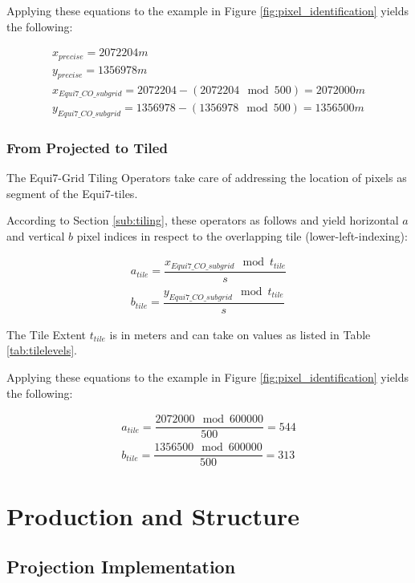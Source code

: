 \documentclass[10pt,a4paper]{article}
\begin{document}
Applying these equations to the example in Figure \ref{fig:pixel_identification} yields the following:

\begin{eqnarray*}
x_{precise} = 2072204m \\
y_{precise} = 1356978m \\
x_{Equi7\_CO\_subgrid} = 2072204 - (2072204\mod 500) = 2072000m \\
y_{Equi7\_CO\_subgrid} = 1356978 - (1356978\mod 500) = 1356500m
\end{eqnarray*}

\subsubsection*{From Projected to Tiled}
The Equi7-Grid Tiling Operators take care of addressing the location of pixels as segment of the Equi7-tiles.

According to Section \ref{sub:tiling}, these operators as follows and yield horizontal $a$ and vertical $b$ pixel indices in respect to the overlapping tile (lower-left-indexing): 

\begin{eqnarray}
a_{tile} = \dfrac{x_{Equi7\_CO\_subgrid} \mod t_{tile}}{s} \\
b_{tile} = \dfrac{y_{Equi7\_CO\_subgrid} \mod t_{tile}}{s}
\end{eqnarray}

The Tile Extent $t_{tile}$ is in meters and can take on values as listed in Table \ref{tab:tilelevels}.

Applying these equations to the example in Figure \ref{fig:pixel_identification} yields the following:

\begin{eqnarray*}
a_{tile} = \dfrac{2072000\mod 600000}{500} = 544 \\
b_{tile} = \dfrac{1356500\mod 600000}{500} = 313
\end{eqnarray*}

\newpage

\section{Production and Structure}
\label{sec:production}

\subsection{Projection Implementation}
\label{sub:proj_impl}
\end{document}
